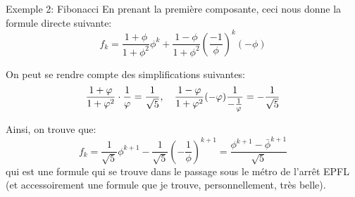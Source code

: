 \documentclass[a4paper]{article}
\begin{document}
\begin{parag}{Exemple 2: Fibonacci}
    En prenant la première composante, ceci nous donne la formule directe suivante: 
    \[f_k = \frac{1 + \phi}{1 + \phi^2} \phi^k + \frac{1 - \phi}{1 + \phi^2}\left(\frac{-1}{\phi}\right)^{k} \left(-\phi\right)\]
     
    On peut se rendre compte des simplifications suivantes: 
    \[\frac{1 + \phi}{1 + \phi^2} \cdot \frac{1}{\phi} = \frac{1}{\sqrt{5}}, \mathspace \frac{1 - \phi}{1 + \phi^2} \left(-\phi\right) \frac{1}{-\frac{1}{\phi}} = -\frac{1}{\sqrt{5}}\]
    
    Ainsi, on trouve que: 
    \[f_k = \frac{1}{\sqrt{5}} \phi^{k+1} - \frac{1}{\sqrt{5}} \left(-\frac{1}{\phi}\right)^{k+1} = \frac{\phi^{k+1} - \bar{\phi}^{k+1}}{\sqrt{5}}\]
    qui est une formule qui se trouve dans le passage sous le métro de l'arrêt EPFL (et accessoirement une formule que je trouve, personnellement, très belle).
\end{parag}
\end{document}

